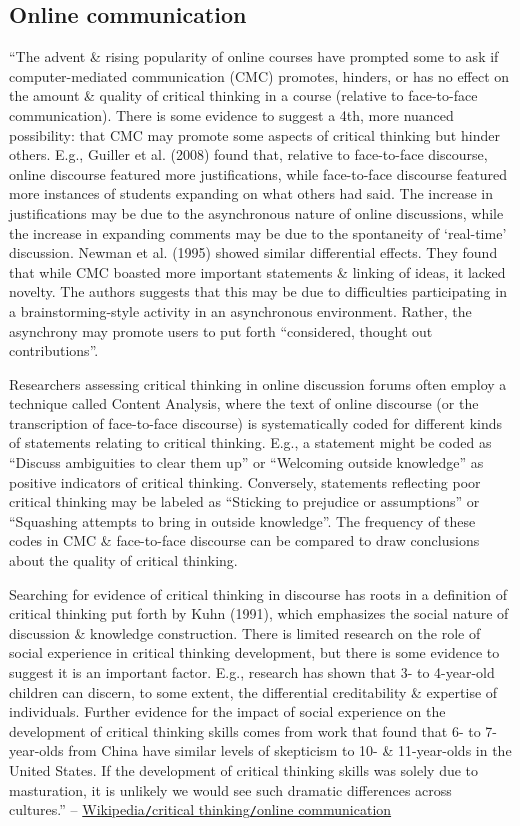 \documentclass[oneside]{book}
\numberwithin{equation}{section}
\begin{document}
\subsection{Online communication}
``The advent \& rising popularity of online courses have prompted some to ask if computer-mediated communication (CMC) promotes, hinders, or has no effect on the amount \& quality of critical thinking in a course (relative to face-to-face communication). There is some evidence to suggest a 4th, more nuanced possibility: that CMC may promote some aspects of critical thinking but hinder others. E.g., Guiller et al. (2008) found that, relative to face-to-face discourse, online discourse featured more justifications, while face-to-face discourse featured more instances of students expanding on what others had said. The increase in justifications may be due to the asynchronous nature of online discussions, while the increase in expanding comments may be due to the spontaneity of `real-time' discussion. Newman et al. (1995) showed similar differential effects. They found that while CMC boasted more important statements \& linking of ideas, it lacked novelty. The authors suggests that this may be due to difficulties participating in a brainstorming-style activity in an asynchronous environment. Rather, the asynchrony may promote users to put forth ``considered, thought out contributions''.

Researchers assessing critical thinking in online discussion forums often employ a technique called Content Analysis, where the text of online discourse (or the transcription of face-to-face discourse) is systematically coded for different kinds of statements relating to critical thinking. E.g., a statement might be coded as ``Discuss ambiguities to clear them up'' or ``Welcoming outside knowledge'' as positive indicators of critical thinking. Conversely, statements reflecting poor critical thinking may be labeled as ``Sticking to prejudice or assumptions'' or ``Squashing attempts to bring in outside knowledge''. The frequency of these codes in CMC \& face-to-face discourse can be compared to draw conclusions about the quality of critical thinking.

Searching for evidence of critical thinking in discourse has roots in a definition of critical thinking put forth by Kuhn (1991), which emphasizes the social nature of discussion \& knowledge construction. There is limited research on the role of social experience in critical thinking development, but there is some evidence to suggest it is an important factor. E.g., research has shown that 3- to 4-year-old children can discern, to some extent, the differential creditability \& expertise of individuals. Further evidence for the impact of social experience on the development of critical thinking skills comes from work that found that 6- to 7-year-olds from China have similar levels of skepticism to 10- \& 11-year-olds in the United States. If the development of critical thinking skills was solely due to masturation, it is unlikely we would see such dramatic differences across cultures.'' -- \href{https://en.wikipedia.org/wiki/Critical_thinking#Online_communication}{Wikipedia\texttt{/}critical thinking\texttt{/}online communication}
\end{document}
